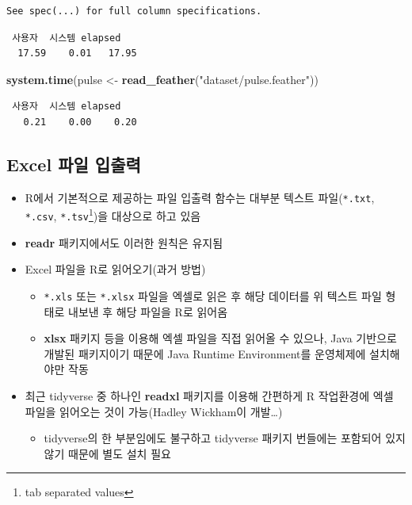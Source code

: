 \documentclass[
  11pt,
]{krantz}
\newenvironment{Shaded}{\begin{snugshade}}{\end{snugshade}}
\newcommand{\KeywordTok}[1]{\textcolor[rgb]{0.27,0.27,0.27}{\textbf{#1}}}
\newcommand{\NormalTok}[1]{#1}
\newcommand{\StringTok}[1]{\textcolor[rgb]{0.5,0.5,0.5}{#1}}
\providecommand{\tightlist}{%
  \setlength{\itemsep}{0pt}\setlength{\parskip}{0pt}}
\begin{document}
\begin{verbatim}
See spec(...) for full column specifications.
\end{verbatim}

\begin{verbatim}
 사용자  시스템 elapsed 
  17.59    0.01   17.95 
\end{verbatim}

\begin{Shaded}
\begin{Highlighting}[]
\KeywordTok{system.time}\NormalTok{(pulse <-}\StringTok{ }\KeywordTok{read_feather}\NormalTok{(}\StringTok{"dataset/pulse.feather"}\NormalTok{))}
\end{Highlighting}
\end{Shaded}

\begin{verbatim}
 사용자  시스템 elapsed 
   0.21    0.00    0.20 
\end{verbatim}

\normalsize

\hypertarget{import-export-excel}{%
\subsection{Excel 파일 입출력}\label{import-export-excel}}

\begin{itemize}
\tightlist
\item
  R에서 기본적으로 제공하는 파일 입출력 함수는 대부분 텍스트 파일(\texttt{*.txt}, \texttt{*.csv}, \texttt{*.tsv}\footnote{tab separated values})을 대상으로 하고 있음
\item
  \textbf{readr} 패키지에서도 이러한 원칙은 유지됨
\item
  Excel 파일을 R로 읽어오기(과거 방법)

  \begin{itemize}
  \tightlist
  \item
    \texttt{*.xls} 또는 \texttt{*.xlsx} 파일을 엑셀로 읽은 후 해당 데이터를 위 텍스트 파일 형태로 내보낸 후 해당 파일을 R로 읽어옴
  \item
    \textbf{xlsx} 패키지 등을 이용해 엑셀 파일을 직접 읽어올 수 있으나, Java 기반으로 개발된 패키지이기 때문에 Java Runtime Environment를 운영체제에 설치해야만 작동
  \end{itemize}
\item
  최근 tidyverse 중 하나인 \textbf{readxl} 패키지를 이용해 간편하게 R 작업환경에 엑셀 파일을 읽어오는 것이 가능(Hadley Wickham이 개발\ldots)

  \begin{itemize}
  \tightlist
  \item
    tidyverse의 한 부분임에도 불구하고 tidyverse 패키지 번들에는 포함되어 있지 않기 때문에 별도 설치 필요
  \end{itemize}
\end{itemize}
\end{document}
